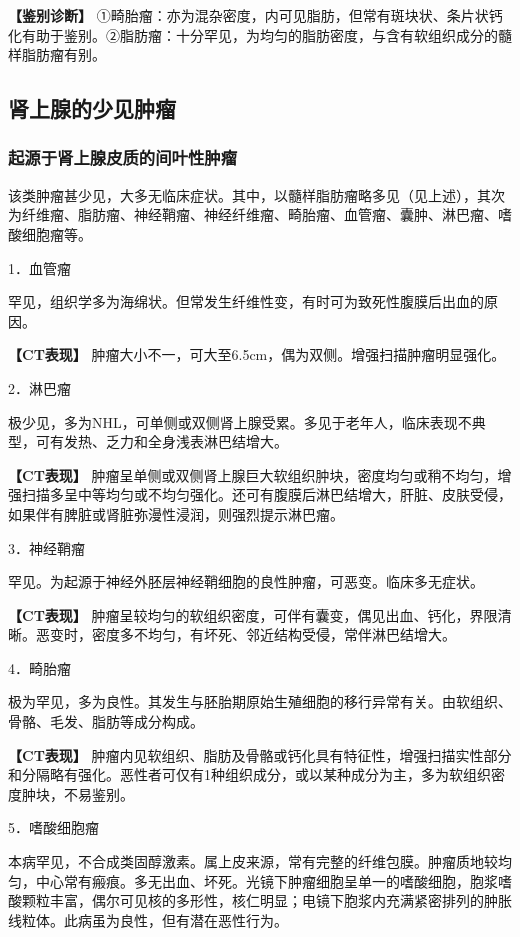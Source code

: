 \textbf{【鉴别诊断】}
①畸胎瘤：亦为混杂密度，内可见脂肪，但常有斑块状、条片状钙化有助于鉴别。②脂肪瘤：十分罕见，为均匀的脂肪密度，与含有软组织成分的髓样脂肪瘤有别。

\subsection{肾上腺的少见肿瘤}

\subsubsection{起源于肾上腺皮质的间叶性肿瘤}

该类肿瘤甚少见，大多无临床症状。其中，以髓样脂肪瘤略多见（见上述），其次为纤维瘤、脂肪瘤、神经鞘瘤、神经纤维瘤、畸胎瘤、血管瘤、囊肿、淋巴瘤、嗜酸细胞瘤等。

1．血管瘤

罕见，组织学多为海绵状。但常发生纤维性变，有时可为致死性腹膜后出血的原因。

\textbf{【CT表现】}
肿瘤大小不一，可大至6.5cm，偶为双侧。增强扫描肿瘤明显强化。

2．淋巴瘤

极少见，多为NHL，可单侧或双侧肾上腺受累。多见于老年人，临床表现不典型，可有发热、乏力和全身浅表淋巴结增大。

\textbf{【CT表现】}
肿瘤呈单侧或双侧肾上腺巨大软组织肿块，密度均匀或稍不均匀，增强扫描多呈中等均匀或不均匀强化。还可有腹膜后淋巴结增大，肝脏、皮肤受侵，如果伴有脾脏或肾脏弥漫性浸润，则强烈提示淋巴瘤。

3．神经鞘瘤

罕见。为起源于神经外胚层神经鞘细胞的良性肿瘤，可恶变。临床多无症状。

\textbf{【CT表现】}
肿瘤呈较均匀的软组织密度，可伴有囊变，偶见出血、钙化，界限清晰。恶变时，密度多不均匀，有坏死、邻近结构受侵，常伴淋巴结增大。

4．畸胎瘤

极为罕见，多为良性。其发生与胚胎期原始生殖细胞的移行异常有关。由软组织、骨骼、毛发、脂肪等成分构成。

\textbf{【CT表现】}
肿瘤内见软组织、脂肪及骨骼或钙化具有特征性，增强扫描实性部分和分隔略有强化。恶性者可仅有1种组织成分，或以某种成分为主，多为软组织密度肿块，不易鉴别。

5．嗜酸细胞瘤

本病罕见，不合成类固醇激素。属上皮来源，常有完整的纤维包膜。肿瘤质地较均匀，中心常有瘢痕。多无出血、坏死。光镜下肿瘤细胞呈单一的嗜酸细胞，胞浆嗜酸颗粒丰富，偶尔可见核的多形性，核仁明显；电镜下胞浆内充满紧密排列的肿胀线粒体。此病虽为良性，但有潜在恶性行为。

